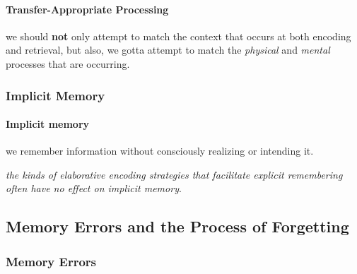 \documentclass{article}
\begin{document}
	\paragraph{Transfer-Appropriate Processing} we should \textbf{not} only attempt to match the context that occurs at both encoding and retrieval, but also, we gotta attempt to match the \emph{physical} and \emph{mental} processes that are occurring.
	\subsubsection{Implicit Memory}
	\paragraph{Implicit memory} we remember information without consciously realizing or intending it.
	
	\emph{the kinds of elaborative encoding strategies that facilitate explicit remembering often have no effect on implicit memory}.
	
	\subsection{Memory Errors and the Process of Forgetting}
	\subsubsection{Memory Errors}
\end{document}
